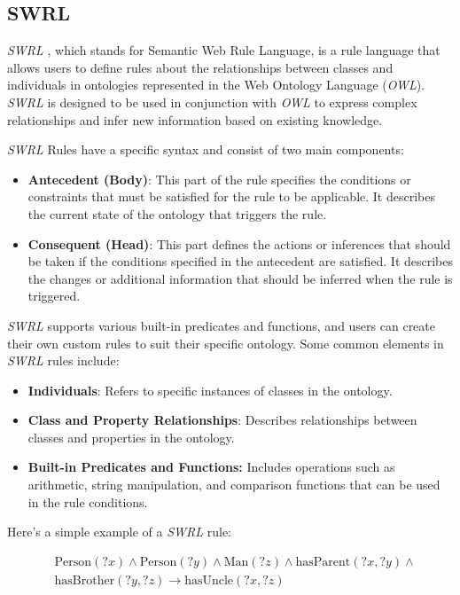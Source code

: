 	\subsection{SWRL}
	\label{sec:SWRL}
	\textit{SWRL} \cite{Horrocks2004}, which stands for Semantic Web Rule Language, is a rule language that allows users to define rules about the relationships between classes and individuals in ontologies represented in the Web Ontology Language (\textit{OWL}). \textit{SWRL} \cite{Horrocks2004} is designed to be used in conjunction with \textit{OWL} to express complex relationships and infer new information based on existing knowledge.

	\textit{SWRL} \cite{Horrocks2004} Rules have a specific syntax and consist of two main components:
	\begin{itemize}
		\item \textbf{Antecedent (Body)}: This part of the rule specifies the conditions or constraints that must be satisfied for the rule to be applicable. It describes the current state of the ontology that triggers the rule.
		\item \textbf{Consequent (Head)}: This part defines the actions or inferences that should be taken if the conditions specified in the antecedent are satisfied. It describes the changes or additional information that should be inferred when the rule is triggered.
	\end{itemize}
	\textit{SWRL} \cite{Horrocks2004} supports various built-in predicates and functions, and users can create their own custom rules to suit their specific ontology. Some common elements in \textit{SWRL} \cite{Horrocks2004} rules include:
	\begin{itemize}
		\item \textbf{Individuals}: Refers to specific instances of classes in the ontology.
		\item \textbf{Class and Property Relationships}: Describes relationships between classes and properties in the ontology.
		\item \textbf{Built-in Predicates and Functions:} Includes operations such as arithmetic, string manipulation, and comparison functions that can be used in the rule conditions.
	\end{itemize}

	Here's a simple example of a \textit{SWRL} \cite{Horrocks2004} rule:
	
	\[
	\begin{aligned}
	&\text{Person}(?x) \land \text{Person}(?y) \land \text{Man}(?z) \land \text{hasParent}(?x, ?y) \land\\
	&\text{hasBrother}(?y, ?z) \rightarrow \text{hasUncle}(?x, ?z)
	\end{aligned}
	\]
	
